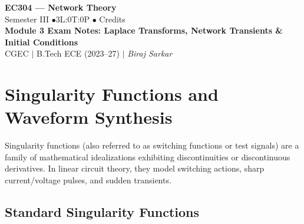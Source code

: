 \documentclass[12pt,a4paper]{article}
\begin{document}
\begin{center}
  {\LARGE\bfseries\color{myred} EC304 --- Network Theory}\\[5pt]
  {\normalsize\color{mydark} Semester III \quad$\bullet$\quad 3L:0T:0P \quad$\bullet$ Credits}\\[3pt]
  {\normalsize\color{myteal}\textbf{Module 3 Exam Notes: Laplace Transforms, Network Transients \& Initial Conditions}}\\[3pt]
  {\small\color{mydark} CGEC \;$|$\; B.Tech ECE (2023--27) \;$|$\; \textit{Biraj Sarkar}}
\end{center}
\vspace{2pt}\noindent{\color{myred}\rule{\linewidth}{1.5pt}}\vspace{2pt}

\hypersetup{linkcolor=mydark}
\tableofcontents
\hypersetup{linkcolor=myteal}
\newpage

\section{Singularity Functions and Waveform Synthesis}

Singularity functions (also referred to as switching functions or test signals) are a family of mathematical idealizations exhibiting discontinuities or discontinuous derivatives. In linear circuit theory, they model switching actions, sharp current/voltage pulses, and sudden transients.

\subsection{Standard Singularity Functions}
\end{document}
